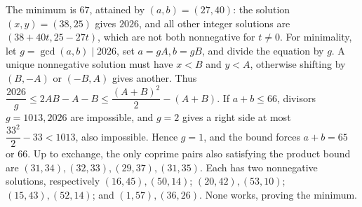 The minimum is $\boxed{67}$, attained by $(a,b)=(27,40)$: the solution $(x,y)=(38,25)$ gives $2026$, and all other integer solutions are $(38+40t,25-27t)$, which are not both nonnegative for $t\ne0$. For minimality, let $g=\gcd(a,b)\mid2026$, set $a=gA,b=gB$, and divide the equation by $g$. A unique nonnegative solution must have $x<B$ and $y<A$, otherwise shifting by $(B,-A)$ or $(-B,A)$ gives another. Thus $\dfrac{2026}{g}\le2AB-A-B\le\dfrac{(A+B)^2}{2}-(A+B)$. If $a+b\le66$, divisors $g=1013,2026$ are impossible, and $g=2$ gives a right side at most $\dfrac{33^2}{2}-33<1013$, also impossible. Hence $g=1$, and the bound forces $a+b=65$ or $66$. Up to exchange, the only coprime pairs also satisfying the product bound are $(31,34),(32,33),(29,37),(31,35)$. Each has two nonnegative solutions, respectively $(16,45),(50,14)$; $(20,42),(53,10)$; $(15,43),(52,14)$; and $(1,57),(36,26)$. None works, proving the minimum.
